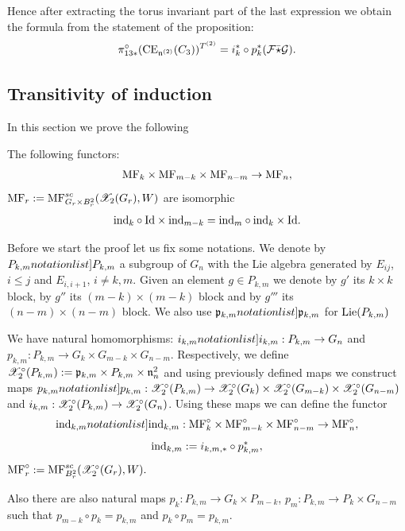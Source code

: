 Hence after extracting the torus invariant part of the last expression we obtain the formula from the statement of the proposition:
 $$ \pi_{13*}^{\circ}(\mathrm{CE}_{\mathfrak{n}^{(2)}}(C_3))^{T^{(2)}}=i^*_k\circ p_k^*( \mathcal{F}\bar{\star}\mathcal{G}).$$





\subsection{Transitivity of induction}
In this section we prove the following
\begin{proposition}\label{prop: ind trans} The following functors:
$$\mathrm{MF}_k\times \mathrm{MF}_{m-k}\times \mathrm{MF}_{n-m}\to \mathrm{MF}_{n},$$
$\mathrm{MF}_r:=\mathrm{MF}^{sc}_{G_r\times B_r^2}(\mathscr{X}_2(G_r),W)$
 are isomorphic
$$ \mathrm{ind}_k\circ \mathrm{Id}\times \mathrm{ind}_{m-k}=\mathrm{ind}_m\circ \mathrm{ind}_k\times \mathrm{Id}.$$
\end{proposition}

Before we start the proof let us fix some notations. We denote by $\SymbolPrint{P_{k,m}}$ a subgroup of $G_n$ with the Lie algebra generated by
$E_{ij}$, $i\le j$ and $E_{i,i+1}$, $i\ne k,m$. Given an element $g\in P_{k,m}$ we denote by $g'$ its $k\times k$ block, by $g''$ its $(m-k)\times (m-k)$ block and
by $g'''$ its $(n-m)\times (n-m)$ block.
 We also use $\SymbolPrint{\frp_{k,m}}$ for $\mathrm{Lie}(P_{k,m})$

 
 We have natural homomorphisms:
$\SymbolPrint{i_{k,m}}: P_{k,m}\to G_n$ and $p_{k,m}: P_{k,m}\to G_k\times G_{m-k}\times G_{n-m}$.
Respectively, we define $\mathscr{X}_2^\circ(P_{k,m}):=\mathfrak{p}_{k,m}\times P_{k,m}\times \mathfrak{n}_n^2$ and using previously defined maps we construct
maps $\SymbolPrint{p_{k,m}}: \calX_2^\circ(P_{k,m})\to \calX_2^\circ(G_k)\times \calX_2^\circ(G_{m-k})\times \calX_2^\circ(G_{n-m})$ and
$i_{k,m}:  \mathscr{X}_2^\circ(P_{k,m})\to \mathscr{X}_2^\circ(G_n)$.
Using these maps we can define the functor
 $$\SymbolPrint{\ind_{k,m}}: \MFs^\circ_{k}\times \MFs^\circ_{m-k}\times \MFs^\circ_{n-m}\to \MFs^\circ_{n},$$
$$
\mathrm{ind}_{k,m}:=i_{k,m,*}\circ p_{k,m}^*,$$
$\mathrm{MF}^\circ_r:=\mathrm{MF}^{sc}_{B^2_r}(\mathscr{X}^\circ_2(G_r),W).$

Also there are also natural maps $p_k: P_{k,m}\to G_k\times P_{m-k}$, $p_m: P_{k,m}\to P_k\times G_{n-m}$ such that $p_{m-k}\circ p_k=p_{k,m}$ and $p_k\circ p_m=p_{k,m}$.

